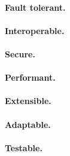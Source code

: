 \paragraph{Fault tolerant.}

\paragraph{Interoperable.}

\paragraph{Secure.}

\paragraph{Performant.}

\paragraph{Extensible.}

\paragraph{Adaptable.}

\paragraph{Testable.}




